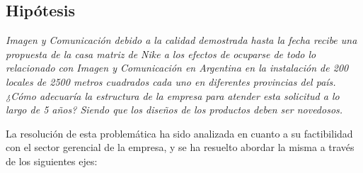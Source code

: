 \documentclass[a4paper,10pt,titlepage]{article}
\begin{document}

\newpage
\subsection{Hipótesis}
\vspace{1cm}
\indent \textit{Imagen y Comunicación debido a la calidad demostrada hasta la fecha recibe una propuesta de la casa matriz de Nike a los efectos de ocuparse de todo lo relacionado con Imagen y Comunicación en Argentina en la instalación de 200 locales de 2500 metros cuadrados cada uno en diferentes provincias del país. ¿Cómo adecuaría la estructura de la empresa para atender esta solicitud a lo largo de 5 años? Siendo que los diseños de los productos deben ser novedosos.}

\indent La resoluci\'on de esta problem\'atica ha sido analizada en cuanto a su factibilidad con el sector gerencial de la empresa, y se ha resuelto abordar la misma a trav\'es de los siguientes ejes:\\
\end{document}
